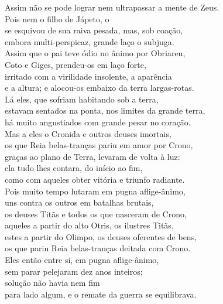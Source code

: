 \begin{pages}
\begin{Rightside}
\quad{}Assim não se pode lograr nem ultrapassar a mente de Zeus.\\
Pois nem o filho de Jápeto, o \\
se esquivou de sua raiva pesada, mas, sob coação, \\
embora multi-perspicaz, grande laço o subjuga.\\[5pt]


Assim que o pai teve ódio no ânimo por Obriareu,\\
Coto e Giges, prendeu-os em laço forte,\\
irritado com a virilidade insolente, a aparência\\
e a altura; e alocou-os embaixo da terra largas-rotas. \\
Lá eles, que sofriam habitando sob a terra,\\
estavam sentados na ponta, nos limites da grande terra,\\
há muito angustiados com grande pesar no coração.\\
Mas a eles o Cronida e outros deuses imortais,\\
os que Reia belas-tranças pariu em amor por Crono, \\
graças ao plano de Terra, levaram de volta à luz:\\
ela tudo lhes contara, do início ao fim,\\
como com aqueles obter vitória e triunfo radiante.\\
Pois muito tempo lutaram em pugna aflige-ânimo,\\
uns contra os outros em batalhas brutais, \\
os deuses Titãs e todos os que nasceram de Crono, \\
aqueles a partir do alto Otris, os ilustres Titãs, \\
estes a partir do Olimpo, os deuses oferentes de bens,\\
os que pariu Reia belas-tranças deitada com Crono.\\
Eles então entre si, em pugna aflige-ânimo, \\
sem parar pelejaram dez anos inteiros;\\
solução não havia  nem fim\\
para lado algum, e o remate da guerra se equilibrava.\\


\end{Rightside}
\end{pages}

